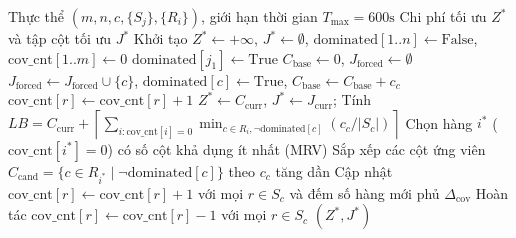 \documentclass[11pt, a4paper]{article}
\begin{document}
\begin{algorithm}[htbp]
\caption{Thuật toán Nhánh cận giải chính xác SCP (\texttt{ExactSolver})}
\label{alg:exact}
\begin{algorithmic}[1]
\Require Thực thể $(m, n, c, \{S_j\}, \{R_i\})$, giới hạn thời gian $T_{\max} = 600\text{s}$
\Ensure Chi phí tối ưu $Z^*$ và tập cột tối ưu $J^*$
\State Khởi tạo $Z^* \leftarrow +\infty$, $J^* \leftarrow \emptyset$, $\text{dominated}[1..n] \leftarrow \text{False}$, $\text{cov\_cnt}[1..m] \leftarrow 0$
 
        \State $\text{dominated}[j_1] \leftarrow \text{True}$
    \EndIf
\EndFor
\State $C_{\text{base}} \leftarrow 0$, $J_{\text{forced}} \leftarrow \emptyset$
    \State $J_{\text{forced}} \leftarrow J_{\text{forced}} \cup \{c\}$, $\text{dominated}[c] \leftarrow \text{True}$, $C_{\text{base}} \leftarrow C_{\text{base}} + c_c$
     $\text{cov\_cnt}[r] \leftarrow \text{cov\_cnt}[r] + 1$ \EndFor
\EndWhile
{}
     \Return \EndIf
        \State $Z^* \leftarrow C_{\text{curr}}$, $J^* \leftarrow J_{\text{curr}}$; \Return
    \EndIf
    \State Tính $LB = C_{\text{curr}} + \left\lceil \sum_{i : \text{cov\_cnt}[i]=0} \min_{c \in R_i, \neg\text{dominated}[c]} (c_c / |S_c|) \right\rceil$
     \Return \EndIf
    \State Chọn hàng $i^*$ ($\text{cov\_cnt}[i^*] = 0$) có số cột khả dụng ít nhất (MRV)
    \State Sắp xếp các cột ứng viên $C_{\text{cand}} = \{c \in R_{i^*} \mid \neg\text{dominated}[c]\}$ theo $c_c$ tăng dần
        \State Cập nhật $\text{cov\_cnt}[r] \leftarrow \text{cov\_cnt}[r] + 1$ với mọi $r \in S_c$ và đếm số hàng mới phủ $\Delta_{\text{cov}}$
        \State {}
        \State Hoàn tác $\text{cov\_cnt}[r] \leftarrow \text{cov\_cnt}[r] - 1$ với mọi $r \in S_c$
    \EndFor
\EndProcedure
\State {}
\State \Return $(Z^*, J^*)$
\end{algorithmic}
\end{algorithm}
\end{document}
